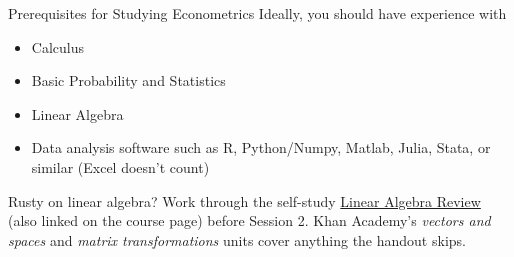 \documentclass[aspectratio=169,11pt]{beamer}
\begin{document}
\begin{frame}{Prerequisites for Studying Econometrics}
Ideally, you should have experience with
\begin{itemize}
	\item Calculus
	\item Basic Probability and Statistics 
	\item Linear Algebra 
	\item Data analysis software such as R, Python/Numpy, Matlab, Julia, Stata, or similar
		(Excel doesn't count) 
\end{itemize}
\medskip
Rusty on linear algebra? Work through the self-study
\href{https://github.com/chrisconlon/applied_metrics/blob/master/Fall/L1\%20-\%20Probability/linear_algebra_handout.pdf}{\alert{Linear Algebra Review}}
(also linked on the course page) before Session 2. Khan Academy's
\emph{vectors and spaces} and \emph{matrix transformations} units cover anything the handout skips.
\end{frame}
% 
\end{document}
